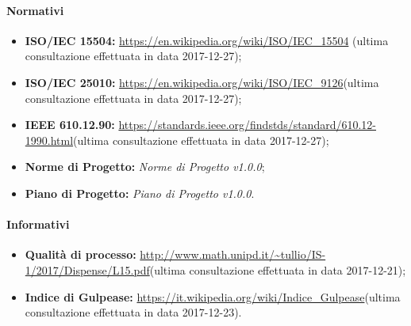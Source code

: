 		\paragraph{Normativi}
			\begin{itemize}
				\item \textbf{ISO/IEC 15504:} \url{https://en.wikipedia.org/wiki/ISO/IEC\_15504} (ultima consultazione effettuata in data 2017-12-27);
				\item \textbf{ISO/IEC 25010:} \url{https://en.wikipedia.org/wiki/ISO/IEC\_9126}(ultima consultazione effettuata in data 2017-12-27);
				\item \textbf{IEEE 610.12.90:} \url{https://standards.ieee.org/findstds/standard/610.12-1990.html}(ultima consultazione effettuata in data 2017-12-27);
				\item \textbf{Norme di Progetto:} \emph{Norme di Progetto v1.0.0};
				\item \textbf{Piano di Progetto:} \emph{Piano di Progetto v1.0.0}.
			\end{itemize}

		\paragraph{Informativi} 
			\begin{itemize}
				\item \textbf{Qualità di processo:} \url{http://www.math.unipd.it/~tullio/IS-1/2017/Dispense/L15.pdf}(ultima consultazione effettuata in data 2017-12-21);
				\item \textbf{Indice di Gulpease:} \url{https://it.wikipedia.org/wiki/Indice\_Gulpease}(ultima consultazione effettuata in data 2017-12-23).
			\end{itemize}